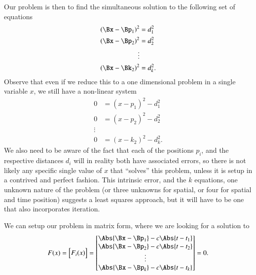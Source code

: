 Our problem is then to find the simultaneous solution to the following set of equations
\begin{equation}\label{eqn:relativisticElectrodynamicsA1:300}
\begin{aligned}
(\Bx - \Bp_1)^2 &= d_1^2 \\
(\Bx - \Bp_2)^2 &= d_2^2 \\
\vdots \\
(\Bx - \Bk_2)^2 &= d_k^2.
\end{aligned}
\end{equation}
Observe that even if we reduce this to a one dimensional problem in a single variable \(x\), we still have a non-linear system
\begin{equation}\label{eqn:relativisticElectrodynamicsA1:300b}
\begin{aligned}
0 &= (x - p_1)^2 - d_1^2 \\
0 &= (x - p_2)^2 - d_2^2 \\
\vdots \\
0 &= (x - k_2)^2 - d_k^2.
\end{aligned}
\end{equation}
We also need to be aware of the fact that each of the positions \(p_i\), and the respective distances \(d_i\) will in reality both have associated errors, so there is not likely any specific single value of \(x\) that ``solves'' this problem, unless it is setup in a contrived and perfect fashion.  This intrinsic error, and the \(k\) equations, one unknown nature of the problem (or three unknowns for spatial, or four for spatial and time position) suggests a least squares approach, but it will have to be one that also incorporates iteration.

We can setup our problem in matrix form, where we are looking for a solution to
\begin{equation}\label{eqn:relativisticElectrodynamicsA1:310}
F(x) =
\begin{bmatrix}
F_i(x)
\end{bmatrix}
=
\begin{bmatrix}
\Abs{\Bx - \Bp_1} - c \Abs{ t - t_1 } \\
\Abs{\Bx - \Bp_2} - c \Abs{ t - t_2 } \\
\vdots \\
\Abs{\Bx - \Bp_k} - c \Abs{ t - t_k } \\
\end{bmatrix}
= 0.
\end{equation}

